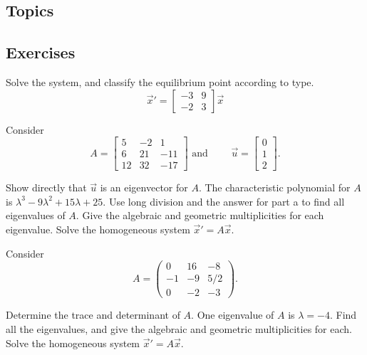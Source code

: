 \reviewSection

\subsection{Topics}

\subsection{Exercises}

\begin{exercise}
Solve the system, and classify the equilibrium point according to type. %
$$\vec{x}'= \begin{bmatrix}-3 & 9 \\ -2&3 \end{bmatrix} \vec{x}$$
\end{exercise}

\begin{exercise}
Consider 
$$A=\begin{bmatrix} 5&-2&1 \\ 6&21&-11 \\ 12&32&-17
\end{bmatrix} \mbox{ and }
\qquad \vec{u}=\begin{bmatrix}0\\1\\2\end{bmatrix}
.$$ %

\begin{tasks}
\task Show directly that $\vec{u}$ is an eigenvector for $A$. 
\task The characteristic polynomial for $A$ is $\lambda^3-9\lambda^2+15\lambda +25$. Use long division and the answer for part a to find all eigenvalues of $A$. Give the algebraic and geometric multiplicities for each eigenvalue.
\task Solve the homogeneous system $\vec{x}'= A\vec{x}$.
\end{tasks}
\end{exercise}

\begin{exercise}
Consider 
$$A=\begin{pmatrix} 0& 16& -8 \\ -1& -9 &5/2\\ 0 &-2 &-3
\end{pmatrix} 
.$$ %
\begin{tasks}
\task Determine the trace and determinant of $A$. 
\task  One eigenvalue of $A$ is $\lambda=-4$. Find all the eigenvalues, and give the algebraic and geometric multiplicities for each.
\task Solve the homogeneous system $\vec{x}'= A\vec{x}$.
\end{tasks}
\end{exercise}

